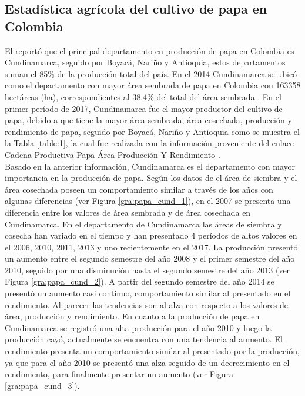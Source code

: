 \subsection{Estadística agrícola del cultivo de papa en Colombia}

El \citet{DANE2002} reportó que el principal departamento en producción de papa en Colombia es Cundinamarca, seguido por Boyacá, Nariño y Antioquia, estos departamentos suman el 85\% de la producción total del país. En el 2014 Cundinamarca se ubicó como el departamento con mayor área sembrada de papa en Colombia con 163358 hectáreas (ha), correspondientes al 38.4\% del total del área sembrada \citep{MADR2014}. En el primer período de 2017, Cundinamarca fue el mayor productor del cultivo de papa, debido a que tiene la mayor área sembrada, área cosechada, producción y rendimiento de papa, seguido por Boyacá, Nariño y Antioquia como se muestra el la Tabla \ref{table:1}, la cual fue realizada con la información proveniente del enlace \textcolor{blue}{ \href{https://www.datos.gov.co/Agricultura-y-Desarrollo-Rural/Cadena-Productiva-Papa-Area-Producci-n-Y-Rendimien/pnsj-t3kh}{Cadena Productiva Papa-Área Producción Y Rendimiento}} \citep{madr2017}.\\

Basado en la anterior información, Cundinamarca es el departamento con mayor importancia en la producción de papa. Según los datos de \citet{madr2017} el área de siembra y  el área cosechada poseen un comportamiento similar a través de los años con algunas diferencias (ver Figura \ref{gra:papa_cund_1}), en el 2007 se presenta una diferencia entre los valores de área sembrada y de área cosechada en Cundinamarca. En el departamento de Cundinamarca las áreas de siembra y cosecha han variado en el tiempo y han presentado 4 períodos de altos valores en el 2006,  2010, 2011, 2013 y uno recientemente en el 2017. La producción  presentó un aumento entre el segundo semestre del año 2008 y el primer semestre del año  2010, seguido por una disminución hasta el segundo semestre del año 2013 (ver Figura \ref{gra:papa_cund_2}). A partir del segundo semestre del año 2014 se presentó un aumento casi continuo, comportamiento similar al presentado en el rendimiento. Al parecer las tendencias son al alza con respecto a los valores de área, producción y rendimiento. En cuanto a la producción de papa en Cundinamarca se registró una alta producción para el año 2010 y luego la producción cayó, actualmente se encuentra con una tendencia al aumento. El rendimiento presenta un comportamiento similar al presentado por la producción, ya que para el año 2010 se presentó una alza seguido de un decrecimiento en el rendimiento, para finalmente presentar un aumento (ver Figura \ref{gra:papa_cund_3}). %


